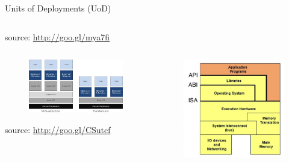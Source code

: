 \begin{frame}{Units of Deployments (UoD)}
{\begin{columns}
\begin{column}{0.3\textwidth}
\begin{figure}
				\end{figure}
				\begin{flushright}
					\tiny{source: \url{http://goo.gl/mya7fi}}
				\end{flushright}
			\end{column}
		\end{columns}
	}
	{
		\begin{columns}
			\begin{column}{0.7\textwidth}
				\begin{figure}
					\centering{}
					\includegraphics[scale=0.7]{images/containerization.png}
				\end{figure}
				\begin{center}
					\tiny{source: \url{http://goo.gl/CSutcf}}
				\end{center}
			\end{column}
			\begin{column}{0.3\textwidth}
				\begin{figure}
					\centering{}
					\includegraphics[scale=0.1]{images/virtualization-level.png}

\end{figure}
\end{column}
\end{columns}}
\end{frame}
